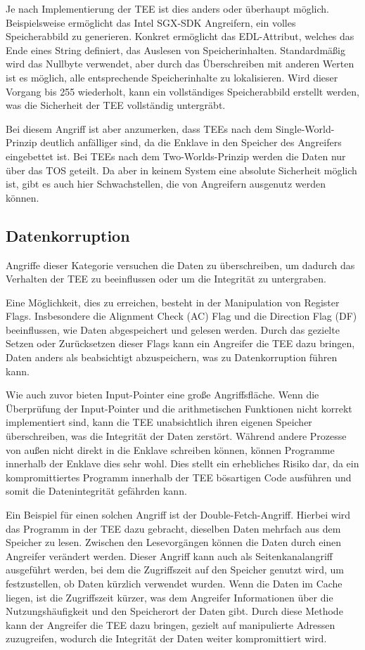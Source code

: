 Je nach Implementierung der TEE ist dies anders oder überhaupt möglich. Beispielsweise ermöglicht das Intel SGX-SDK Angreifern, ein volles Speicherabbild zu generieren. Konkret ermöglicht das EDL-Attribut, welches das Ende eines String definiert, das Auslesen von Speicherinhalten. Standardmäßig wird das Nullbyte verwendet, aber durch das Überschreiben mit anderen Werten ist es möglich, alle entsprechende Speicherinhalte zu lokalisieren. Wird dieser Vorgang bis 255 wiederholt, kann ein vollständiges Speicherabbild erstellt werden, was die Sicherheit der TEE vollständig untergräbt\cite{IntelSGX}\cite{TEEPaper}.

Bei diesem Angriff ist aber anzumerken, dass TEEs nach dem Single-World-Prinzip deutlich anfälliger sind, da die Enklave in den Speicher des Angreifers eingebettet ist. Bei TEEs nach dem Two-Worlds-Prinzip werden die Daten nur über das TOS geteilt. Da aber in keinem System eine absolute Sicherheit möglich ist, gibt es auch hier Schwachstellen, die von Angreifern ausgenutz werden können.

\subsection{Datenkorruption}
Angriffe dieser Kategorie versuchen die Daten zu überschreiben, um dadurch das Verhalten der TEE zu beeinflussen oder um die Integrität zu untergraben.

Eine Möglichkeit, dies zu erreichen, besteht in der Manipulation von Register Flags. Insbesondere die Alignment Check (AC) Flag und die Direction Flag (DF) beeinflussen, wie Daten abgespeichert und gelesen werden. Durch das gezielte Setzen oder Zurücksetzen dieser Flags kann ein Angreifer die TEE dazu bringen, Daten anders als beabsichtigt abzuspeichern, was zu Datenkorruption führen kann.

Wie auch zuvor bieten Input-Pointer eine große Angriffsfläche. Wenn die Überprüfung der Input-Pointer und die arithmetischen Funktionen nicht korrekt implementiert sind, kann die TEE unabsichtlich ihren eigenen Speicher überschreiben, was die Integrität der Daten zerstört. Während andere Prozesse von außen nicht direkt in die Enklave schreiben können, können Programme innerhalb der Enklave dies sehr wohl. Dies stellt ein erhebliches Risiko dar, da ein kompromittiertes Programm innerhalb der TEE bösartigen Code ausführen und somit die Datenintegrität gefährden kann.

Ein Beispiel für einen solchen Angriff ist der Double-Fetch-Angriff. Hierbei wird das Programm in der TEE dazu gebracht, dieselben Daten mehrfach aus dem Speicher zu lesen. Zwischen den Lesevorgängen können die Daten durch einen Angreifer verändert werden. Dieser Angriff kann auch als Seitenkanalangriff ausgeführt werden, bei dem die Zugriffszeit auf den Speicher genutzt wird, um festzustellen, ob Daten kürzlich verwendet wurden. Wenn die Daten im Cache liegen, ist die Zugriffszeit kürzer, was dem Angreifer Informationen über die Nutzungshäufigkeit und den Speicherort der Daten gibt. Durch diese Methode kann der Angreifer die TEE dazu bringen, gezielt auf manipulierte Adressen zuzugreifen, wodurch die Integrität der Daten weiter kompromittiert wird.


